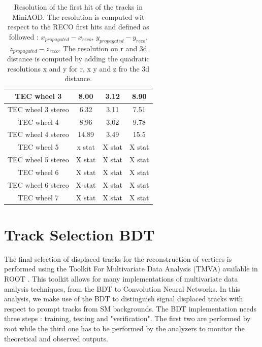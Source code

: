 \documentclass{cernatlasnote}
\begin{document}
\begin{appendices}
\begin{table}
\begin{tabular}{|c|c|c|c|}
          \hline
         TEC wheel 3 & 8.00 & 3.12 & 8.90\\
          \hline
         TEC wheel 3 stereo & 6.32 & 3.11 &  7.51\\
          \hline
         TEC wheel 4 & 8.96 & 3.02 & 9.78\\
          \hline
         TEC wheel 4 stereo & 14.89 & 3.49 & 15.5\\
          \hline
         TEC wheel 5 & x stat &  X stat  &  X stat\\
          \hline
         TEC wheel 5 stereo & X stat & X stat &  X stat\\
          \hline
         TEC wheel 6 & X stat & X stat & X stat\\
          \hline
         TEC wheel 6 stereo & X stat & X stat & X stat\\
          \hline
         TEC wheel 7 & X stat & X stat & X stat\\
        \hline
    \end{tabular}
    \caption{Resolution of the first hit  of the tracks in MiniAOD. The resolution is computed wit respect to the RECO first hits and defined as followed : $x_{propagated}-x_{reco}$, $y_{propagated}-y_{reco}$,$z_{propagated}-z_{reco}$. The resolution on r and 3d distance is computed by adding the quadratic resolutions x and y for r, x y and z fro the 3d distance.}
    \label{tab:FIRSTHITRES}
\end{table}

\pagebreak
\section{Track Selection BDT}
\label{APP: TRKBDT}
 The final selection of displaced tracks for the reconstruction of vertices is performed using the Toolkit For Multivariate Data Analysis (TMVA) available in ROOT \cite{hoecker2009tmvatoolkitmultivariate}. This toolkit allows for many implementations of multivariate data analysis techniques, from the BDT to Convolution Neural Networks. In this analysis, we make use of the BDT to distinguish signal displaced tracks with respect to prompt tracks from SM backgrounds.  The BDT implementation needs three steps : training, testing and "verification". The first two are performed by root while the third one has to be performed by the analyzers to monitor the theoretical and observed outputs.\\
 

\end{appendices}
\end{document}
